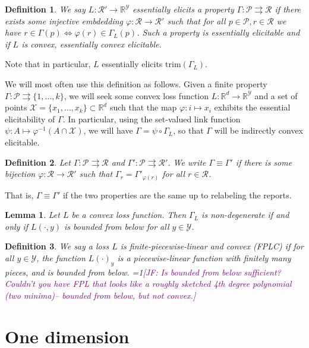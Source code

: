\documentclass[11pt]{article}
\newcommand{\Comments}{1}
\newcommand{\mynote}[2]{\ifnum\Comments=1\textcolor{#1}{#2}\fi}
\newcommand{\jessie}[1]{\mynote{purple}{[JF: #1]}}
\newcommand{\reals}{\mathbb{R}}
\renewcommand{\P}{\mathcal{P}}
\newcommand{\R}{\mathcal{R}}
\newcommand{\X}{\mathcal{X}}
\newcommand{\Y}{\mathcal{Y}}
\renewcommand{\P}{\mathcal{P}}
\newcommand{\toto}{\rightrightarrows}
\newcommand{\trim}{\mathrm{trim}}
\newtheorem{lemma}{Lemma}
\newtheorem{definition}{Definition}
\begin{document}
\begin{definition}
  We say $L:\R'\to\reals^\Y$ \emph{essentially elicits} a property $\Gamma : \P \toto \R$ if there exists some injective embdedding $\varphi:\R\to\R'$ such that for all $p\in\P,r\in\R$ we have $r \in \Gamma(p) \iff \varphi(r) \in \Gamma_L(p)$.
  Such a property is \emph{essentially elicitable} and if $L$ is convex, \emph{essentially convex elicitable}.
\end{definition}
Note that in particular, $L$ essentially elicits $\trim(\Gamma_L)$.

We will most often use this definition as follows.
Given a finite property $\Gamma : \P \toto \{1,\ldots,k\}$, we will seek some convex loss function $L : \reals^d \to \reals^\Y$ and a set of points $\X=\{x_1,\ldots,x_k\} \subset \reals^d$ such that the map $\varphi:i\mapsto x_i$ exhibits the essential elicitability of $\Gamma$.
In particular, using the set-valued link function $\psi:A\mapsto \varphi^{-1}(A\cap\X)$, we will have $\Gamma = \psi \circ \Gamma_L$, so that $\Gamma$ will be indirectly convex elicitable.

\begin{definition}
  Let $\Gamma:\P\toto\R$ and $\Gamma':\P\toto\R'$.
  We write $\Gamma \equiv \Gamma'$ if there is some bijection $\varphi:\R\to\R'$ such that $\Gamma_r = \Gamma'_{\varphi(r)}$ for all $r\in\R$.
\end{definition}
That is, $\Gamma\equiv\Gamma'$ if the two properties are the same up to relabeling the reports.

\begin{lemma}
  Let $L$ be a convex loss function.
  Then $\Gamma_L$ is non-degenerate if and only if $L(\cdot,y)$ is bounded from below for all $y\in\Y$.
\end{lemma}

\begin{definition}
  We say a loss $L$ is \emph{finite-piecewise-linear and convex (FPLC)} if for all $y\in\Y$, the function $L(\cdot)_y$ is a piecewise-linear function with finitely many pieces, and is bounded from below.
\jessie{Is bounded from below sufficient?  Couldn't you have FPL that looks like a roughly sketched 4th degree polynomial (two minima)-- bounded from below, but not convex.}
\end{definition}

\section{One dimension}
\end{document}
